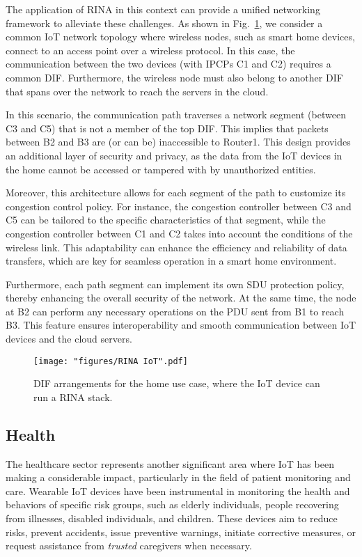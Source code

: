 \documentclass{ieeeaccess}
\begin{document}
The application of RINA in this context can provide a unified networking framework to alleviate these challenges. As shown in Fig.~\ref{fig:rina-iot}, we consider a common IoT network topology where wireless nodes, such as smart home devices, connect to an access point over a wireless protocol. In this case, the communication between the two devices (with IPCPs C1 and C2) requires a common DIF. Furthermore, the wireless node must also belong to another DIF that spans over the network to reach the servers in the cloud.

In this scenario, the communication path traverses a network segment (between C3 and C5) that is not a member of the top DIF. This implies that packets between B2 and B3 are (or can be) inaccessible to Router1. This design provides an additional layer of security and privacy, as the data from the IoT devices in the home cannot be accessed or tampered with by unauthorized entities.

Moreover, this architecture allows for each segment of the path to customize its congestion control policy. For instance, the congestion controller between C3 and C5 can be tailored to the specific characteristics of that segment, while the congestion controller between C1 and C2 takes into account the conditions of the wireless link. This adaptability can enhance the efficiency and reliability of data transfers, which are key for seamless operation in a smart home environment.

Furthermore, each path segment can implement its own SDU protection policy, thereby enhancing the overall security of the network. At the same time, the node at B2 can perform any necessary operations on the PDU sent from B1 to reach B3. This feature ensures interoperability and smooth communication between IoT devices and the cloud servers.





\begin{figure}[!t]
	\centering
	\texttt{[image: "figures/RINA IoT".pdf]}
	\caption{DIF arrangements for the home use case, where the IoT device can run a RINA stack.}
	\label{fig:rina-iot}
\end{figure}

\subsection{Health}

The healthcare sector represents another significant area where IoT has been making a considerable impact, particularly in the field of patient monitoring and care. Wearable IoT devices have been instrumental in monitoring the health and behaviors of specific risk groups, such as elderly individuals, people recovering from illnesses, disabled individuals, and children. These devices aim to reduce risks, prevent accidents, issue preventive warnings, initiate corrective measures, or request assistance from \textit{trusted} caregivers when necessary.
\end{document}
